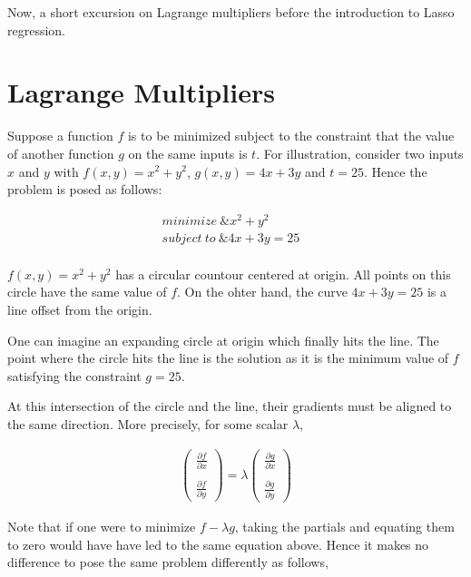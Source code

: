 \documentclass[11pt, a4paper]{article}
\begin{document}
Now, a short excursion on Lagrange multipliers before the  introduction to Lasso regression.

\section{Lagrange Multipliers}

Suppose a function $f$ is to be minimized subject to the constraint that the value of another function $g$ on the same inputs is $t$. For illustration, consider two inputs $x$ and $y$ with $f(x, y) = x^2 + y^2$, $g(x, y) = 4x + 3y$ and $t = 25$. Hence the problem is posed as follows:

\begin{align*}
	minimize\ \&x^2 + y^2 &              \\
	subject\ to\ \&4x + 3y = 25 &              \\
\end{align*}

$f(x, y) = x^2 + y^2$ has a circular countour centered at origin. All points on this circle have the same value of $f$. On the ohter hand, the curve $4x + 3y = 25$ is a line offset from the origin. 

One can imagine an expanding circle at origin which finally hits the line. The point where the circle hits the line is the solution as it is the minimum value of $f$ satisfying the constraint $g=25$. 

At this intersection of the circle and the line, their gradients must be aligned to the same direction. More precisely, for some scalar $\lambda$,

\begin{align*}
	\begin{pmatrix}\frac{\partial f}{\partial x} \\
	                                             \\  \frac{\partial f}{\partial y} \end{pmatrix} = \lambda  \begin{pmatrix}\frac{\partial g}{\partial x} \\ \\ \frac{\partial g}{\partial y} \end{pmatrix}
\end{align*}

Note that if one were to minimize $f - \lambda g$, taking the partials and equating them to zero would have have led to the same equation above. Hence it makes no difference to pose the same problem differently as follows,
\end{document}
